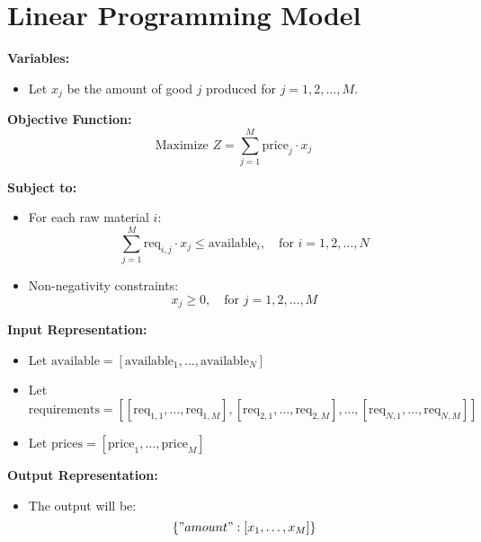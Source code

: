 \documentclass{article}
\begin{document}
\section*{Linear Programming Model}

\textbf{Variables:}
\begin{itemize}
    \item Let \( x_j \) be the amount of good \( j \) produced for \( j = 1, 2, \ldots, M \).
\end{itemize}

\textbf{Objective Function:}
\[
\text{Maximize } Z = \sum_{j=1}^{M} \text{price}_{j} \cdot x_j
\]

\textbf{Subject to:}
\begin{itemize}
    \item For each raw material \( i \):
    \[
    \sum_{j=1}^{M} \text{req}_{i,j} \cdot x_j \leq \text{available}_{i}, \quad \text{for } i = 1, 2, \ldots, N
    \]
    
    \item Non-negativity constraints:
    \[
    x_j \geq 0, \quad \text{for } j = 1, 2, \ldots, M
    \]
\end{itemize}

\textbf{Input Representation:}
\begin{itemize}
    \item Let \( \text{available} = [\text{available}_{1}, \ldots, \text{available}_{N}] \)
    \item Let \( \text{requirements} = [[\text{req}_{1,1}, \ldots, \text{req}_{1,M}], [\text{req}_{2,1}, \ldots, \text{req}_{2,M}], \ldots, [\text{req}_{N,1}, \ldots, \text{req}_{N,M}]] \)
    \item Let \( \text{prices} = [\text{price}_{1}, \ldots, \text{price}_{M}] \)
\end{itemize}

\textbf{Output Representation:}
\begin{itemize}
    \item The output will be:
    \[
    \{ "amount": [x_{1}, \ldots, x_{M}] \}
    \]
\end{itemize}
\end{document}
